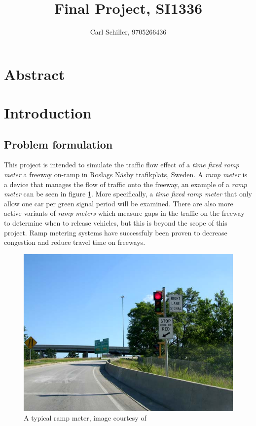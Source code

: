 \documentclass{article}
\author{Carl Schiller, 9705266436}
\title{Final Project, SI1336}
\begin{document}
\maketitle

\section*{Abstract}

\tableofcontents

\newpage

\section{Introduction}
  \subsection{Problem formulation}
    This project is intended to simulate the traffic flow effect of a \textit{time fixed ramp
    meter} a freeway
    on-ramp in Roslags Näsby trafikplats, Sweden. A \textit{ramp meter} is a device that
    manages the flow of traffic onto the freeway, an example of a \textit{ramp meter} can be seen in figure \ref{pic:ramp}.
    More specifically, a \textit{time fixed ramp
    meter} that only allow one car per green signal period will be examined. There are also
    more active variants of \textit{ramp meters} which measure gaps in the traffic on the freeway
    to determine when to release vehicles, but this is beyond the scope of this project.
    Ramp metering systems have successfuly been proven to decrease congestion and
    reduce travel time on freeways.
    ~\cite{u.s._department_of_transportation_federal_highway_administration_ramp_nodate}
    \begin{figure}
      \includegraphics[width=\linewidth]{"ramp meter"}
      \caption{A typical ramp meter, image courtesy of \cite{patriarca12_english:_2008}}
      \label{pic:ramp}
    \end{figure}
\end{document}
